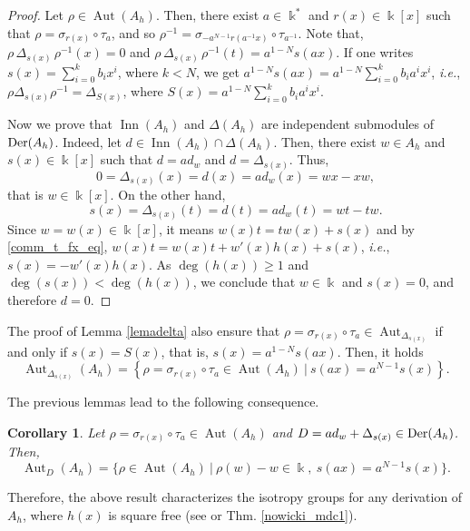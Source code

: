 \documentclass{article}
\numberwithin{equation}{section}\theoremstyle{plain}
\newtheorem{corollary}[theorem]{Corollary}
\newcommand{\der}{{\rm Der}}
\DeclareMathOperator{\Aut}{Aut}
\DeclareMathOperator{\Inn}{Inn}
\begin{document}
\begin{proof}
Let $\rho \in \Aut(A_h)$.
Then, there exist $a \in \Bbbk^*$ and $r(x) \in \Bbbk[x]$ such that $\rho=\sigma_{r(x)} \circ \tau_a$, and so $\rho^{-1} = \sigma_{-a^{N-1}r(a^{-1}x)} \circ \tau_{a^{-1}}$.
Note that, $\rho \, \Delta_{s(x)} \, \rho^{-1} (x) = 0$ and $\rho \, \Delta_{s(x)} \, \rho^{-1}(t) = a^{1-N}s(ax)$.
If one writes $s(x) = \sum_{i=0}^k b_ix^i$, where $k < N$, we get $a^{1-N}s(ax) = a^{1-N} \sum_{i=0}^k  b_i a^i x^i$, \emph{i.e.}, $\rho \Delta_{s(x)} \rho^{-1} = \Delta_{S(x)}$, where $S(x) = a^{1-N} \sum_{i=0}^k  b_i a^i x^i$.

Now we prove that $\Inn(A_h)$ and $\Delta(A_h)$ are independent submodules of $\der(A_h)$.
Indeed, let $d \in \Inn(A_h) \cap \Delta(A_h)$.
Then, there exist $w \in A_h$ and $s(x) \in \Bbbk[x]$ such that $d=ad_w$ and $d=\Delta_{s(x)}$.
Thus, 
$$0 = \Delta_{s(x)}(x) = d(x) = ad_w(x) = wx - xw,$$
that is $w \in \Bbbk[x]$.
On the other hand, 
$$s(x) = \Delta_{s(x)}(t) = d(t) = ad_w(t) = wt - tw.$$
Since $w=w(x) \in \Bbbk[x]$, it means $w(x)t = tw(x)+s(x)$ and  by \eqref{comm_t_fx_eq}, $w(x)t = w(x)t + w'(x)h(x) + s(x)$, \emph{i.e.}, $s(x) = -w'(x)h(x)$.
As $\deg(h(x))\geq 1$ and $\deg(s(x))<\deg(h(x))$, we conclude that $w \in \Bbbk$ and $s(x)=0$, and therefore $d=0$.
\end{proof}


The proof of Lemma \ref{lemadelta} also ensure that $\rho=\sigma_{r(x)}\circ\tau_a \in \Aut_{\Delta_{s(x)}}$ if and only if $s(x)=S(x)$, that is, $s(x) = a^{1-N}s(ax)$.
Then, it holds
 \begin{equation}\label{cond_s}
    \Aut_{\Delta_{s(x)}}(A_h)=\left\{\rho=\sigma_{r(x)}\circ\tau_a \in \Aut(A_h) \ | \ s(ax)=a^{N-1}s(x)\right\}.
\end{equation}

The previous lemmas lead to the following consequence.

\begin{corollary}\label{pro_grupoisotro_1}
     Let $\rho=\sigma_{r(x)}\circ\tau_a \in \Aut(A_h)$ and $D=ad_w+\Delta_{s(x)} \in \der(A_h)$.
    Then, 
\begin{equation*}
    \Aut_D(A_h) =\{\rho \in \Aut(A_h) \ | \ \rho(w)-w\in \Bbbk, \ s(ax)=a^{N-1}s(x)\}.
\end{equation*}
\end{corollary}

Therefore, the above result characterizes the isotropy groups for any derivation of $A_h$, where $h(x)$ is square free (see \cite[Thm. 10.1]{Nowicki} or Thm. \ref{nowicki_mdc1}).
\end{document}
